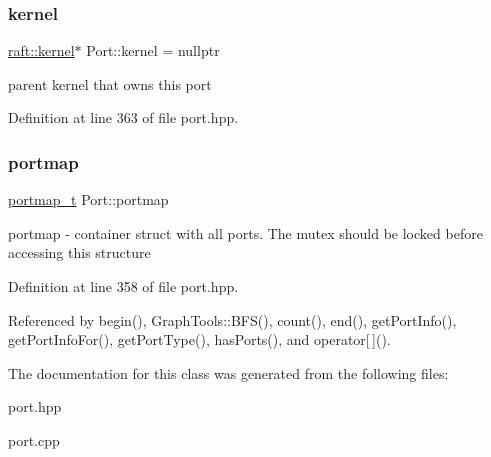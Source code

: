 \subsubsection{\texorpdfstring{kernel}{kernel}}
{\footnotesize\ttfamily \hyperlink{classraft_1_1kernel}{raft\+::kernel}$\ast$ Port\+::kernel = nullptr\hspace{0.3cm}{\ttfamily [protected]}}

parent kernel that owns this port 

Definition at line 363 of file port.\+hpp.

\hypertarget{class_port_a537a8a0c2a47acbf8654f286200aee90}{}\label{class_port_a537a8a0c2a47acbf8654f286200aee90} 
\subsubsection{\texorpdfstring{portmap}{portmap}}
{\footnotesize\ttfamily \hyperlink{structportmap__t}{portmap\+\_\+t} Port\+::portmap\hspace{0.3cm}{\ttfamily [protected]}}

portmap -\/ container struct with all ports. The mutex should be locked before accessing this structure 

Definition at line 358 of file port.\+hpp.



Referenced by begin(), Graph\+Tools\+::\+B\+F\+S(), count(), end(), get\+Port\+Info(), get\+Port\+Info\+For(), get\+Port\+Type(), has\+Ports(), and operator\mbox{[}$\,$\mbox{]}().



The documentation for this class was generated from the following files\+:\begin{DoxyCompactItemize}
\item 
port.\+hpp\item 
port.\+cpp\end{DoxyCompactItemize}

